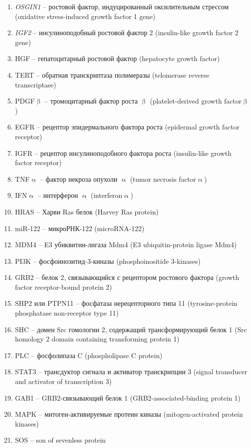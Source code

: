 \begin{enumerate}
	\item \textit{OSGIN1} -- ростовой фактор, индуцированный оксилительным стрессом (oxidative stress-induced growth factor 1 gene)
	\item \textit{IGF2} -- инсулиноподобный ростовой фактор 2 (insulin-like growth factor 2 gene)
	\item HGF -- гепатоцитарный ростовой фактор (hepatocyte growth factor)
	\item TERT -- обратная транскриптаза полимеразы (telomerase reverse transcriptase)
	\item PDGF$\upbeta$ -- тромоцитарный фактор роста $\upbeta$ (platelet-derived growth factor$\upbeta$)
	\item EGFR -- рецептор эпидермального фактора роста (epidermal growth factor receptor)
	\item IGFR -- рецептор инсулиноподобного фактора роста (insulin-like growth factor receptor)
	\item TNF$\upalpha$ -- фактор некроза опухоли $\upalpha$ (tumor necrosis factor$\upalpha$)
	\item IFN$\upalpha$ -- интерферон $\upalpha$ (interferon$\upalpha$)
	\item HRAS -- Харви Ras белок (Harvey Ras protein)
	\item miR-122 -- микроРНК-122 (microRNA-122)
	\item MDM4 -- E3 убиквитин-лигаза Mdm4 (E3 ubiquitin-protein ligase Mdm4)
	\item PI3K -- фосфоинозитид-3-киназы (phosphoinositide 3-kinases)
	\item GRB2 -- белок 2, связывающийся с рецептором ростового фактора (growth factor receptor-bound protein 2)
	\item SHP2 или PTPN11 -- фосфатаза нерецепторного типа 11 (tyrosine-protein phosphatase non-receptor type 11)
	\item SHC -- домен Src гомологии 2, содержащий трансформирующий белок 1 (Src homology 2 domain containing transforming protein 1)
	\item PLC -- фосфолипаза C (phospholipase C protein)
	\item STAT3 -- трансдуктор сигнала и активатор транскрипции 3 (signal transducer and activator of transcription 3)
	\item GAB1 -- GRB2-связывающий белок 1 (GRB2-associated-binding protein 1)
	\item MAPK -- митоген-активируемые протеин киназы (mitogen-activated protein kinases)
	\item SOS -- son of sevenless protein

\end{enumerate}
